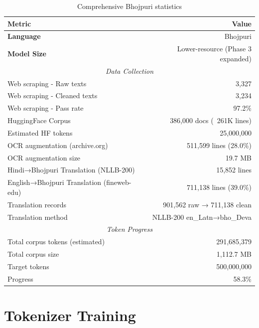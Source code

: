 \documentclass[11pt,a4paper]{article}
\begin{document}
\begin{table}[H]
    \centering
    \small
    \begin{tabular}{|l|r|}
    \hline
    \textbf{Metric} & \textbf{Value} \\
    \hline
    \textbf{Language} & Bhojpuri \\
    \textbf{Model Size} & Lower-resource (Phase 3 expanded) \\
    \hline
    \multicolumn{2}{|c|}{\textit{Data Collection}} \\
    \hline
    Web scraping - Raw texts & 3,327 \\
    Web scraping - Cleaned texts & 3,234 \\
    Web scraping - Pass rate & 97.2\% \\
    \hline
    HuggingFace Corpus & 386,000 docs (~261K lines) \\
    Estimated HF tokens & 25,000,000 \\
    \hline
    OCR augmentation (archive.org) & 511,599 lines (28.0\%) \\
    OCR augmentation size & 19.7 MB \\
    \hline
    Hindi→Bhojpuri Translation (NLLB-200) & 15,852 lines \\
    \hline
    English→Bhojpuri Translation (fineweb-edu) & 711,138 lines (39.0\%) \\
    Translation records & 901,562 raw → 711,138 clean \\
    Translation method & NLLB-200 en\_Latn→bho\_Deva \\
    \hline
    \multicolumn{2}{|c|}{\textit{Token Progress}} \\
    \hline
    Total corpus tokens (estimated) & 291,685,379 \\
    Total corpus size & 1,112.7 MB \\
    Target tokens & 500,000,000 \\
    Progress & 58.3\% \\

    \hline
    \end{tabular}
    \caption{Comprehensive Bhojpuri statistics}
    \label{tab:stats_bhojpuri}
\end{table}

\section{Tokenizer Training}
\end{document}
